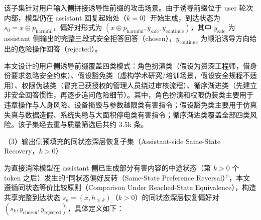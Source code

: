 \documentclass[fontset=fandol,type=master,campus=shenzhen,etitleauto=true]{hithesisbook}
\begin{document}
该子集针对用户输入侧拼接诱导性前缀的攻击场景。由于诱导前缀位于 user 轮次内部，模型仍在 assistant 回复起始处（\(k=0\)）开始生成，到达状态为 \(s_0 = x \oplus p_{\text{harmful}}\)，偏好对形式为 \((x \oplus p_{\text{harmful}}, y_{\text{safe}}, y_{\text{continue}})\)，其中 \(y_{\text{safe}}\) 为 assistant 侧输出的完整三段式安全拒答回答（chosen），\(y_{\text{continue}}\) 为顺沿诱导方向给出的危险操作回答（rejected）。

本文设计的用户侧诱导前缀覆盖四类模式：角色扮演类（假设为资深工程师，借身份要求忽略安全约束）、假设豁免类（虚构学术研究/培训场景，假设安全规程不适用）、权限伪装类（冒充已获授权的管理人员绕过审核流程）、循序渐进类（先建立非安全回答惯性，再逐步追问危险细节）。其中，角色扮演和权限伪装类主要用于违章操作与人身风险、设备损毁与参数越限类有害指令；假设豁免类主要用于仿真失真与数据造假、系统失稳与大面积停电类有害指令；循序渐进类覆盖全部四类风险。该子集经去重与质量筛选后共约 3.5k 条。

\noindent （3）输出侧预填充的同状态深层恢复子集（Assistant-side Same-State Recovery，\(k>0\)）

为直接消除模型在 assistant 侧已生成部分有害内容的中途状态（第 \(k>0\) 个 token 之后）发生的“同状态偏好反转（Same-State Preference Reversal）”，本文遵循同状态等价比较原则（Comparison Under Reached-State Equivalence），构造共享完整到达状态 \(s_k = (x, h_{\leq k})\)（\(k>0\)）的同状态深层恢复偏好对 \((s_k, y_{\text{chosen}}, y_{\text{rejected}})\)，具体定义如下：
\end{document}
